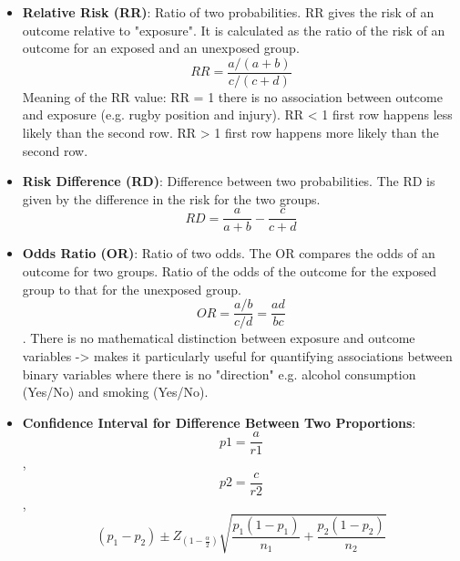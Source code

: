 \documentclass[12pt]{book}
\begin{document}

\newpage

\pagestyle{fancy}

\begin{itemize}
\item \textbf{Relative Risk (RR)}: Ratio of two probabilities. RR gives the risk of an outcome relative to "exposure". It is calculated as the ratio of the risk of an outcome for an exposed and an unexposed group. $$RR = \frac{a/(a+b)}{c/(c+d)}$$
Meaning of the RR value: RR = 1 there is no association between outcome and exposure (e.g. rugby position and injury). RR < 1 first row happens less likely than the second row. RR > 1 first row happens more likely than the second row.
\item \textbf{Risk Difference (RD)}: Difference between two probabilities. The RD is given by the difference in the risk for the two groups. $$RD = \frac{a}{a + b} - \frac{c}{c + d}$$
\item \textbf{Odds Ratio (OR)}: Ratio of two odds. The OR compares the odds of an outcome for two groups. Ratio of the odds of the outcome for the exposed group to that for the unexposed group. $$OR = \frac{a/b}{c/d} = \frac{ad}{bc}$$. There is no mathematical distinction between exposure and outcome variables -> makes it particularly useful for quantifying associations between binary variables where there is no "direction" e.g. alcohol consumption (Yes/No) and smoking (Yes/No).
\item \textbf{Confidence Interval for Difference Between Two Proportions}: $$p1 = \frac{a}{r1}$$, $$p2 = \frac{c}{r2}$$, $$(p_1 - p_2) \pm Z_{(1 - \frac{\alpha}{2})} \sqrt{\frac{p_1(1-p_1)}{n_1} + \frac{p_2(1-p_2)}{n_2}}$$


\end{itemize}
\end{document}
